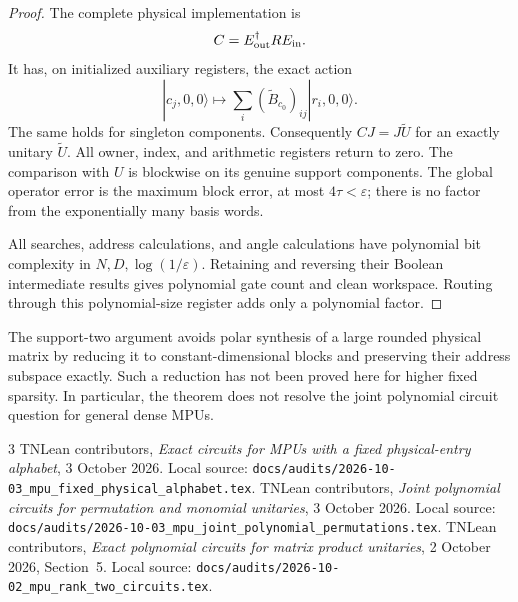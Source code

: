 \documentclass[11pt]{article}
\begin{document}
\begin{proof}
The complete physical implementation is
\[
 C=E_{\rm out}^\dagger R E_{\rm in}.
\]
It has, on initialized auxiliary registers, the
exact action
\[
 |c_j,0,0\rangle
      \longmapsto
 \sum_i(\widetilde B_{c_0})_{ij}|r_i,0,0\rangle.
\]
The same holds for singleton components.
Consequently $CJ=J\widetilde U$ for an exactly unitary
$\widetilde U$. All owner, index, and arithmetic
registers return to zero.
The comparison with $U$ is blockwise on its genuine
support components. The global operator error is
the maximum block error, at most $4\tau<\varepsilon$;
there is no factor from the exponentially many
basis words.

All searches, address calculations, and angle
calculations have polynomial bit complexity in
$N,D,\log(1/\varepsilon)$. Retaining and reversing
their Boolean intermediate results gives polynomial
gate count and clean workspace. Routing through this
polynomial-size register adds only a polynomial factor.
\end{proof}

The support-two argument avoids polar synthesis of a
large rounded physical matrix by reducing it to
constant-dimensional blocks and preserving their
address subspace exactly. Such a reduction has not
been proved here for higher fixed sparsity. In
particular, the theorem does not resolve the joint
polynomial circuit question for general dense MPUs.

\begin{thebibliography}{3}
TNLean contributors,
\emph{Exact circuits for MPUs with a fixed physical-entry alphabet},
3 October 2026.
Local source:
\nolinkurl{docs/audits/2026-10-03_mpu_fixed_physical_alphabet.tex}.
TNLean contributors,
\emph{Joint polynomial circuits for permutation and monomial unitaries},
3 October 2026.
Local source:
\nolinkurl{docs/audits/2026-10-03_mpu_joint_polynomial_permutations.tex}.
TNLean contributors,
\emph{Exact polynomial circuits for matrix product unitaries},
2 October 2026, Section~5.
Local source:
\nolinkurl{docs/audits/2026-10-02_mpu_rank_two_circuits.tex}.
\end{thebibliography}
\end{document}

